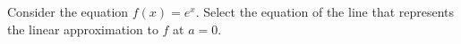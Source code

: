 \documentclass{ximera}
\author{Nela Lakos \and Kyle Parsons}
\begin{document}
\begin{exercise}

Consider the equation $f(x) = e^x$.  Select the equation of the line that represents the linear approximation to $f$ at $a=0$.
\begin{multipleChoice}
\end{multipleChoice}

\end{exercise}
\end{document}
